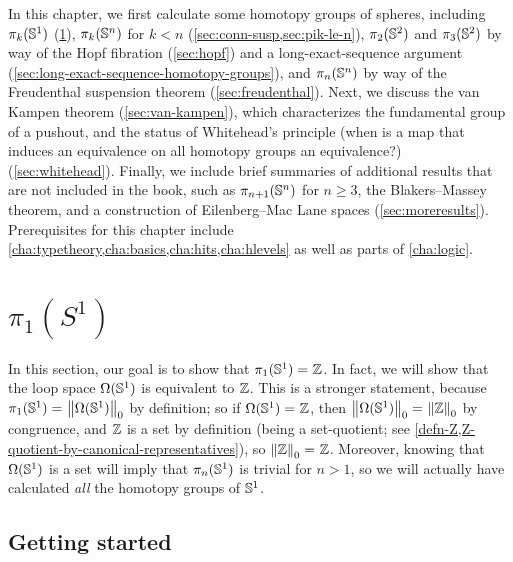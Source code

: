 In this chapter, we first calculate some homotopy groups of spheres,
including $\pi_k(\Sn ^1)$ (\cref{sec:pi1-s1-intro}), $\pi_{k}(\Sn
^n)$ for $k<n$ (\cref{sec:conn-susp,sec:pik-le-n}), $\pi_2(\Sn ^2)$ and $\pi_3(\Sn ^2)$ by
way of the Hopf fibration (\cref{sec:hopf}) and a long-exact-sequence
argument (\cref{sec:long-exact-sequence-homotopy-groups}), and
$\pi_n(\Sn ^n)$ by way of the Freudenthal suspension theorem
(\cref{sec:freudenthal}).  Next, we discuss the van Kampen theorem
(\cref{sec:van-kampen}), which characterizes the fundamental group of
a pushout, and the status of Whitehead's principle (when is a map that
induces an equivalence on all homotopy groups an equivalence?)
(\cref{sec:whitehead}).  Finally, we include brief summaries of
additional results that are not included in the book, such as
$\pi_{n+1}(\Sn ^n)$ for $n\ge 3$, the Blakers--Massey theorem, and a
construction of Eilenberg--Mac Lane spaces (\cref{sec:moreresults}).
Prerequisites for this chapter include \cref{cha:typetheory,cha:basics,cha:hits,cha:hlevels} as well as parts of \cref{cha:logic}.

\section{\texorpdfstring{$\pi_1(S^1)$}{π₁(S¹)}}
\label{sec:pi1-s1-intro}

In this section, our goal is to show that $\id {\pi_1(\Sn ^1)} {\Z}$.
In fact, we will show that the loop space ${\Omega(\Sn ^1)}$ is equivalent to $\Z$.
This is a stronger statement, because $\id{\pi_1(\Sn ^1)} {\trunc 0 {\Omega(\Sn ^1)}}$ by
definition; so if $\id {\Omega(\Sn ^1)} {\Z}$, then $\id {\trunc
  0 {\Omega(\Sn ^1)}} {\trunc 0 {\Z}}$ by congruence, and
$\Z$ is a set by definition (being a set-quotient; see \cref{defn-Z,Z-quotient-by-canonical-representatives}), so $\id {\trunc 0 {\Z}} {\Z}$.
Moreover, knowing that ${\Omega(\Sn ^1)}$ is a set will imply that $\pi_n(\Sn^1)$ is trivial for $n>1$, so we will actually have calculated \emph{all} the homotopy groups of $\Sn^1$.

\subsection{Getting started}
\label{sec:pi1s1-initial-thoughts}

